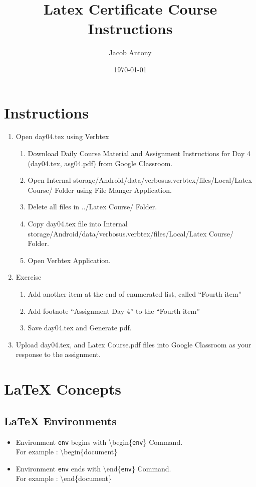 \documentclass{article}
\title{Latex Certificate Course Instructions}
\author{Jacob Antony}
\date{\today}
\begin{document}
\maketitle

\section*{Instructions}
\begin{enumerate}
	\item Open day04.tex using Verbtex
	\begin{enumerate}
		\item Download Daily Course Material and Assignment Instructions for Day 4 (day04.tex, asg04.pdf) from Google Classroom.
		\item Open Internal storage/Android/data/verbosus.verbtex/files/Local/Latex Course/ Folder using File Manger Application.
		\item Delete all files in ../Latex Course/ Folder.
		\item Copy day04.tex file into Internal storage/Android/data/verbosus.verbtex/files/Local/Latex Course/  Folder.
		\item Open Verbtex Application.
	\end{enumerate}
	\item Exercise
	\begin{enumerate}
		\item Add another item at the end of enumerated list, called ``Fourth item''
		\item Add footnote ``Assignment Day 4'' to the ``Fourth item''
		\item Save day04.tex and Generate pdf.
	\end{enumerate}
	\item Upload day04.tex, and Latex Course.pdf files into Google Classroom as your response to the assignment.
\end{enumerate}

\section{\LaTeX{} Concepts}

\subsection{\LaTeX{} Environments}
\begin{itemize}
	\item Environment \texttt{env} begins with \textbackslash{}begin\{\texttt{env}\} Command.\\ For example : \textbackslash{}begin\{document\}
	\item Environment \texttt{env} ends with  \textbackslash{}end\{\texttt{env}\} Command.\\ For example : \textbackslash{}end\{document\}
\end{itemize}
\end{document}
